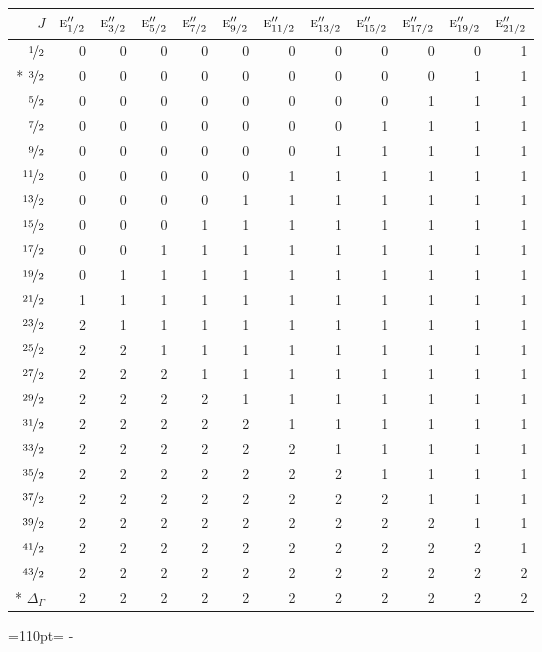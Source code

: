 \documentclass[10pt,a4paper]{article}
\makeatletter
\def\grouprule#1#2{\noalign{\marks\LTgroupmarks{\the\belowrulesep}\nobreak\vskip#1%
  \vskip\aboverulesep}\multispan\LT@cols\unskip{\leaders\hrule\@height#2\hfill\kern\z@}\cr
  \noalign{\penalty\LTrulebreak\vskip\belowrulesep\global\@lastruleclass\z@}}
\newcommand{\needspace}[1]{\par\penalty-100\begingroup\dimen0=#1\relax\dimen2=\pagegoal
  \advance\dimen2-\pagetotal\ifdim\dimen0>\dimen2\relax\ifdim\dimen2>0pt\vfil\break\fi\fi
  \endgroup}
\numberwithin{equation}{section}
\newcommand{\irr}[1]{\text{\normalfont\scshape #1}}
\makeatother
\begin{document}
{\small\begin{longtable}{@{}rrrrrrrrrrrr@{}}\toprule
$J$ & $\irr{e}_{1/2}''$ & $\irr{e}_{3/2}''$ & $\irr{e}_{5/2}''$ & $\irr{e}_{7/2}''$ & $\irr{e}_{9/2}''$ & $\irr{e}_{11/2}''$ & $\irr{e}_{13/2}''$ & $\irr{e}_{15/2}''$ & $\irr{e}_{17/2}''$ & $\irr{e}_{19/2}''$ & $\irr{e}_{21/2}''$\\\midrule\endhead
\bottomrule\endfoot\endlastfoot
$\nicefrac{1}{2}$ & 0 & 0 & 0 & 0 & 0 & 0 & 0 & 0 & 0 & 0 & 1\\*
$\nicefrac{3}{2}$ & 0 & 0 & 0 & 0 & 0 & 0 & 0 & 0 & 0 & 1 & 1\\
$\nicefrac{5}{2}$ & 0 & 0 & 0 & 0 & 0 & 0 & 0 & 0 & 1 & 1 & 1\\
$\nicefrac{7}{2}$ & 0 & 0 & 0 & 0 & 0 & 0 & 0 & 1 & 1 & 1 & 1\\
$\nicefrac{9}{2}$ & 0 & 0 & 0 & 0 & 0 & 0 & 1 & 1 & 1 & 1 & 1\\
$\nicefrac{11}{2}$ & 0 & 0 & 0 & 0 & 0 & 1 & 1 & 1 & 1 & 1 & 1\\
$\nicefrac{13}{2}$ & 0 & 0 & 0 & 0 & 1 & 1 & 1 & 1 & 1 & 1 & 1\\
$\nicefrac{15}{2}$ & 0 & 0 & 0 & 1 & 1 & 1 & 1 & 1 & 1 & 1 & 1\\
$\nicefrac{17}{2}$ & 0 & 0 & 1 & 1 & 1 & 1 & 1 & 1 & 1 & 1 & 1\\
$\nicefrac{19}{2}$ & 0 & 1 & 1 & 1 & 1 & 1 & 1 & 1 & 1 & 1 & 1\\
$\nicefrac{21}{2}$ & 1 & 1 & 1 & 1 & 1 & 1 & 1 & 1 & 1 & 1 & 1\\
$\nicefrac{23}{2}$ & 2 & 1 & 1 & 1 & 1 & 1 & 1 & 1 & 1 & 1 & 1\\
$\nicefrac{25}{2}$ & 2 & 2 & 1 & 1 & 1 & 1 & 1 & 1 & 1 & 1 & 1\\
$\nicefrac{27}{2}$ & 2 & 2 & 2 & 1 & 1 & 1 & 1 & 1 & 1 & 1 & 1\\
$\nicefrac{29}{2}$ & 2 & 2 & 2 & 2 & 1 & 1 & 1 & 1 & 1 & 1 & 1\\
$\nicefrac{31}{2}$ & 2 & 2 & 2 & 2 & 2 & 1 & 1 & 1 & 1 & 1 & 1\\
$\nicefrac{33}{2}$ & 2 & 2 & 2 & 2 & 2 & 2 & 1 & 1 & 1 & 1 & 1\\
$\nicefrac{35}{2}$ & 2 & 2 & 2 & 2 & 2 & 2 & 2 & 1 & 1 & 1 & 1\\
$\nicefrac{37}{2}$ & 2 & 2 & 2 & 2 & 2 & 2 & 2 & 2 & 1 & 1 & 1\\
$\nicefrac{39}{2}$ & 2 & 2 & 2 & 2 & 2 & 2 & 2 & 2 & 2 & 1 & 1\\
$\nicefrac{41}{2}$ & 2 & 2 & 2 & 2 & 2 & 2 & 2 & 2 & 2 & 2 & 1\\
$\nicefrac{43}{2}$ & 2 & 2 & 2 & 2 & 2 & 2 & 2 & 2 & 2 & 2 & 2\\*
\grouprule{0pt}{\lightrulewidth} $\Delta_\Gamma$ & 2 & 2 & 2 & 2 & 2 & 2 & 2 & 2 & 2 & 2 & 2\\
\bottomrule\end{longtable}}
\needspace{110pt}
\end{document}
